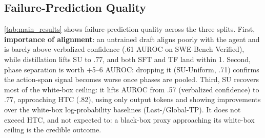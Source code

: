 \documentclass[11pt]{article}
\newcommand{\Hnumber}[1]{#1}
\begin{document}
\subsection{Failure-Prediction Quality}
\label{sec:quality}

\autoref{tab:main_results} shows
failure-prediction quality across the three splits. First, \textbf{importance of alignment}: an untrained draft aligns poorly with the
agent and is barely above verbalized confidence (\Hnumber{.61} AUROC on SWE-Bench Verified), while
distillation lifts SU to \Hnumber{.77}, and both SFT and TF land within \Hnumber{1}. Second, phase separation is worth \Hnumber{+5--6} AUROC:
dropping it (SU-Uniform, \Hnumber{.71}) confirms the action-span signal becomes worse once phases are
pooled. 
Third, SU recovers most of the white-box ceiling: it lifts AUROC from \Hnumber{.57} (verbalized confidence) to \Hnumber{.77}, approaching HTC (\Hnumber{.82}), using only output tokens and showing improvements over
the white-box log-probability baselines (Last-/Global-TP). It does not exceed HTC, and not expected to:
a black-box proxy approaching its white-box ceiling is the credible outcome. 
\end{document}
